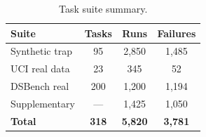 \begin{table}[t]
\centering
\caption{Task suite summary.}
\label{tab:task-summary}
\small
\begin{tabular}{@{}lccc@{}}
\toprule
Suite & Tasks & Runs & Failures \\
\midrule
Synthetic trap & 95 & 2{,}850 & 1{,}485 \\
UCI real data & 23 & 345 & 52 \\
DSBench real & 200 & 1{,}200 & 1{,}194 \\
Supplementary & --- & 1{,}425 & 1{,}050 \\
\midrule
\textbf{Total} & \textbf{318} & \textbf{5{,}820} & \textbf{3{,}781} \\
\bottomrule
\end{tabular}
\end{table}
